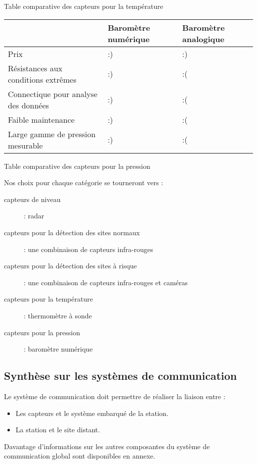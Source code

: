 \documentclass{mise_en_page}
\begin{document}
Table comparative des capteurs pour la température

\begin{flushleft}
\tablehead{}
\begin{supertabular}{|m{5.303cm}|m{5.303cm}|m{5.339cm}|}
\hline
~
 &
Baromètre numérique &
Baromètre analogique\\\hline
Prix &
:) &
:)\\\hline
Résistances aux conditions extrêmes &
:) &
:(\\\hline
Connectique pour analyse des données &
:) &
:(\\\hline
Faible maintenance &
:) &
:(\\\hline
Large gamme de pression mesurable &
:) &
:(\\\hline
\end{supertabular}
\end{flushleft}

Table comparative des capteurs pour la pression

Nos choix pour chaque catégorie se tourneront vers :

\begin{description}
\item[capteurs de niveau] : radar
\item[capteurs pour la détection des sites normaux] : une combinaison de
capteurs infra-rouges 
\item[capteurs pour la détection des sites à risque] : une combinaison de
capteurs infra-rouges et caméras
\item[capteurs pour la température] : thermomètre à sonde
\item[capteurs pour la pression] : baromètre numérique
\end{description}

\subsection{Synthèse sur les systèmes de communication}
Le système de communication doit permettre de réaliser la liaison entre
:

\begin{itemize}
\item Les capteurs et le système embarqué de la station.
\item La station et le site distant.
\end{itemize}
Davantage d’informations sur les autres composantes du système de
communication global sont disponibles en annexe.
\end{document}
